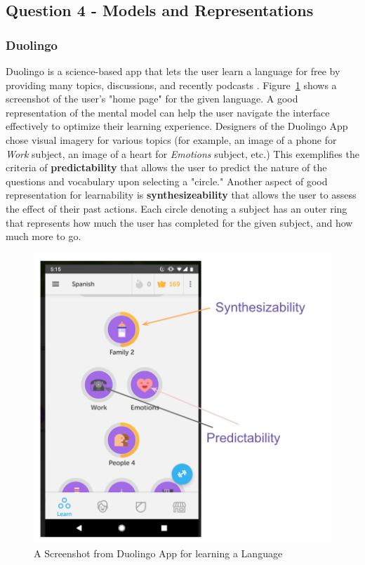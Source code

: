 \documentclass[12pt,letterpaper]{article}
\begin{document}
\subsection*{Question 4 - Models and Representations}

\subsubsection*{Duolingo}
Duolingo is a science-based app that lets the user learn a language for free by providing many topics, discussions, and recently podcasts \cite{von2013duolingo}. Figure~\ref{fig::3} shows a screenshot of the user's "home page" for the given language. A good representation of the mental model can help the user navigate the interface effectively to optimize their learning experience. Designers of the Duolingo App chose visual imagery for various topics (for example, an image of a phone for \textit{Work} subject, an image of a heart for \textit{Emotions} subject, etc.) This exemplifies the criteria of \textbf{predictability} that allows the user to predict the nature of the questions and vocabulary upon selecting a "circle." Another aspect of good representation for learnability is \textbf{synthesizeability} that allows the user to assess the effect of their past actions. Each circle denoting a subject has an outer ring that represents how much the user has completed for the given subject, and how much more to go.

\begin{figure}[h]
\centering
\includegraphics[scale=.6]{figures/p3/duolingvo.png}
\caption{A Screenshot from Duolingo App for learning a Language}
\label{fig::3}
\end{figure}
\end{document}
